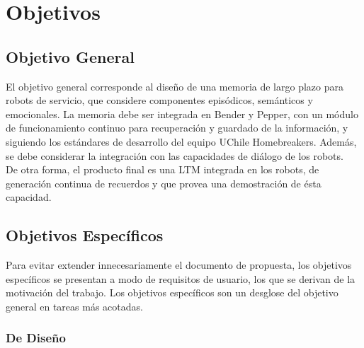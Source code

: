 \documentclass[12pt,letterpaper,spanish]{article}
\begin{document}
\section{Objetivos}

\subsection{Objetivo General}

El objetivo general corresponde al dise\~no de una memoria de largo plazo para robots de servicio, que considere componentes epis\'odicos, sem\'anticos y emocionales. La memoria debe ser integrada en Bender y Pepper, con un m\'odulo de funcionamiento continuo para recuperaci\'on y guardado de la informaci\'on, y siguiendo los est\'andares de desarrollo del equipo UChile Homebreakers. Adem\'as, se debe considerar la integraci\'on con las capacidades de di\'alogo de los robots.\\

De otra forma, el producto final es una LTM integrada en los robots, de generaci\'on continua de recuerdos y que provea una demostraci\'on de \'esta capacidad.\\


\subsection{Objetivos Espec\'ificos}

Para evitar extender innecesariamente el documento de propuesta, los objetivos espec\'ificos se presentan a modo de requisitos de usuario, los que se derivan de la motivaci\'on del trabajo. Los objetivos espec\'ificos son un desglose del objetivo general en tareas m\'as acotadas.\\

\subsubsection{De Dise\~no}
\end{document}
